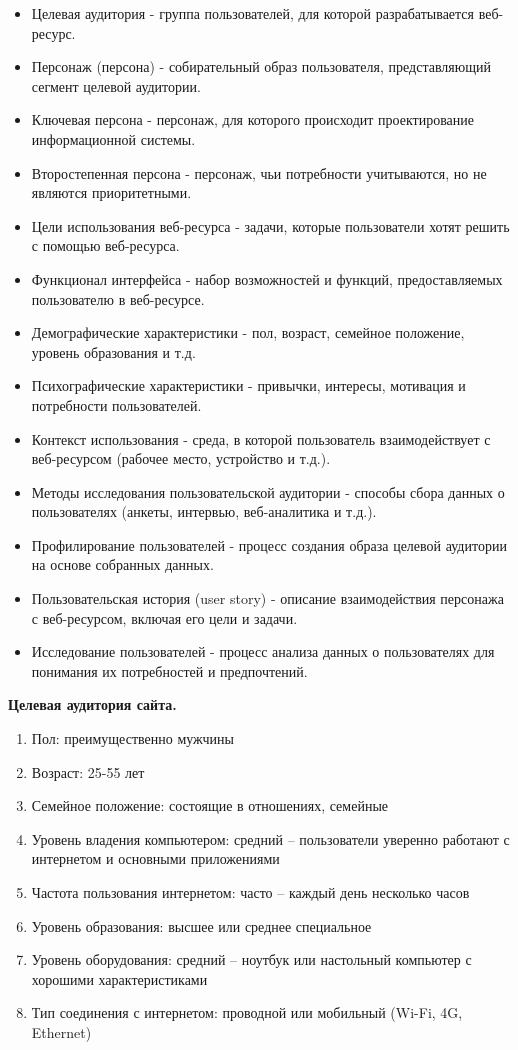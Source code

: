 \begin{itemize}
    \item Целевая аудитория - группа пользователей, для которой разрабатывается веб-ресурс.
    \item Персонаж (персона) - собирательный образ пользователя, представляющий сегмент целевой аудитории.
    \item Ключевая персона - персонаж, для которого происходит проектирование информационной системы.
    \item Второстепенная персона - персонаж, чьи потребности учитываются, но не являются приоритетными.
    \item Цели использования веб-ресурса - задачи, которые пользователи хотят решить с помощью веб-ресурса.
    \item Функционал интерфейса - набор возможностей и функций, предоставляемых пользователю в веб-ресурсе.
    \item Демографические характеристики - пол, возраст, семейное положение, уровень образования и т.д.
    \item Психографические характеристики - привычки, интересы, мотивация и потребности пользователей.
    \item Контекст использования - среда, в которой пользователь взаимодействует с веб-ресурсом (рабочее место, устройство и т.д.).
    \item Методы исследования пользовательской аудитории - способы сбора данных о пользователях (анкеты, интервью, веб-аналитика и т.д.).
    \item Профилирование пользователей - процесс создания образа целевой аудитории на основе собранных данных.
    \item Пользовательская история (user story) - описание взаимодействия персонажа с веб-ресурсом, включая его цели и задачи.
    \item Исследование пользователей - процесс анализа данных о пользователях для понимания их потребностей и предпочтений.
\end{itemize}
\bigskip

\textbf{Целевая аудитория сайта.}

\begin{enumerate}
    \item Пол: преимущественно мужчины
    \item Возраст: 25-55 лет
    \item Семейное положение: состоящие в отношениях, семейные
    \item Уровень владения компьютером: средний – пользователи уверенно работают с интернетом и основными приложениями
    \item Частота пользования интернетом: часто – каждый день несколько часов
    \item Уровень образования: высшее или среднее специальное
    \item Уровень оборудования: средний – ноутбук или настольный компьютер с хорошими характеристиками
    \item Тип соединения с интернетом: проводной или мобильный (Wi-Fi, 4G, Ethernet)
\end{enumerate}
\bigskip

